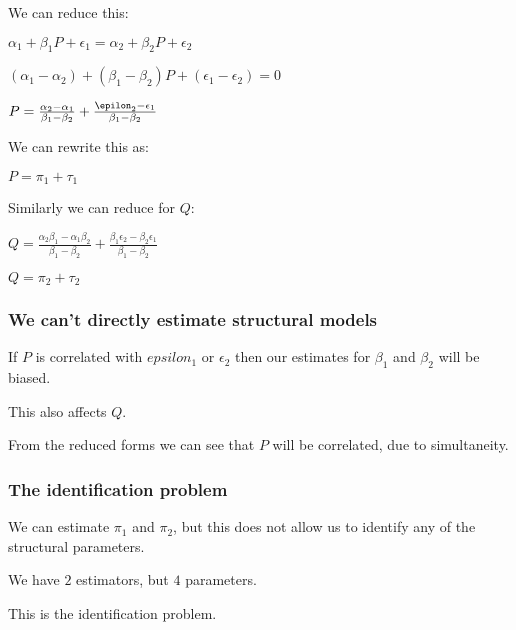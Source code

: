 We can reduce this:

\(\alpha_1 + \beta_1 P + \epsilon_1 =\alpha_2 + \beta_2 P + \epsilon_2 \)

\((\alpha_1 -\alpha_2 )+ (\beta_1 -\beta_2 )P + (\epsilon_1 -\epsilon_2 )=0\)

\(P =\frac{\alpha_2-\alpha_1 }{\beta_1-\beta_2}+\frac{\epilon_2-\epsilon_1 }{\beta_1-\beta_2}\)

We can rewrite this as:

\(P=\pi_1 + \tau_1 \)

Similarly we can reduce for \(Q\):

\(Q =\frac{\alpha_2\beta_1-\alpha_1\beta_2 }{\beta_1-\beta_2}+\frac{\beta_1\epsilon_2 -\beta_2\epsilon_1}{\beta_1-\beta_2}\)

\(Q= \pi_2 + \tau_2\)

\subsubsection{We can't directly estimate structural models}

If \(P\) is correlated with \(epsilon_1\) or \(\epsilon_2\) then our estimates for \(\beta_1\) and \(\beta_2\) will be biased.

This also affects \(Q\).

From the reduced forms we can see that \(P\) will be correlated, due to simultaneity.

\subsubsection{The identification problem}

We can estimate \(\pi_1 \) and \(\pi_2\), but this does not allow us to identify any of the structural parameters.

We have \(2\) estimators, but \(4\) parameters.

This is the identification problem.

